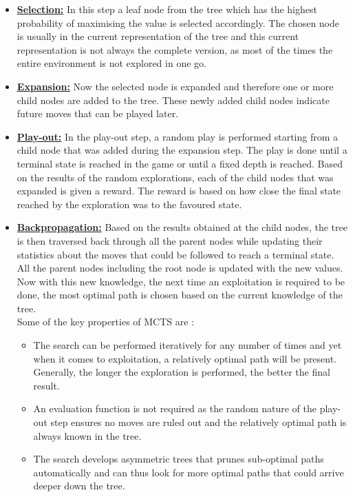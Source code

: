 \documentclass{svproc}
\begin{document}
	\begin{itemize}
	
		\item \textbf{\underline{Selection:}} In this step a leaf node from the tree which has the highest probability of maximising the value is selected accordingly. The chosen node is usually in the current representation of the tree and this current representation is not always the complete version, as most of the times the entire environment is not explored in one go. 
		\newline
		\item \textbf{\underline{Expansion:}} Now the selected node is expanded and therefore one or more child nodes are added to the tree. These newly added child nodes indicate future moves that can be played later.
		\newline
		\item \textbf{\underline{Play-out:}} In the play-out step, a random play is performed starting from a child node that was 	added during the expansion step. The play is done until a terminal state is reached in the game or until a fixed depth is reached. Based on the results of the random explorations, each of the child nodes that was expanded is given a reward. The reward is based on how close the final state reached by the exploration was to the favoured state.
		\newline
		\item \textbf{\underline{Backpropagation:}} Based on the results obtained at the child nodes, the tree is then traversed back through all the parent nodes while updating their statistics about the moves that could be followed to reach a terminal state. All the parent nodes including the root node is updated with the new values. Now with this new knowledge, the next time an exploitation is required to be done, the most optimal path is chosen based on the current knowledge of the tree. \\
	
    	 Some of the key properties of MCTS are \cite{mcts_keyProps}:\\
	
		\begin{itemize}
	
			\item The search can be performed iteratively for any number of times and yet when it comes to exploitation, a relatively optimal path will be present. Generally, the longer the exploration is performed, the better the final result.
	
			\item An evaluation function is not required as the random nature of the play-out step ensures no moves are ruled out and the relatively optimal path is always known in the tree.
	
			\item The search develops asymmetric trees that prunes sub-optimal paths automatically and can thus look for more optimal paths that could arrive deeper down the tree.
			
		\end{itemize}
    
    	\end{itemize}
    
\end{document}
